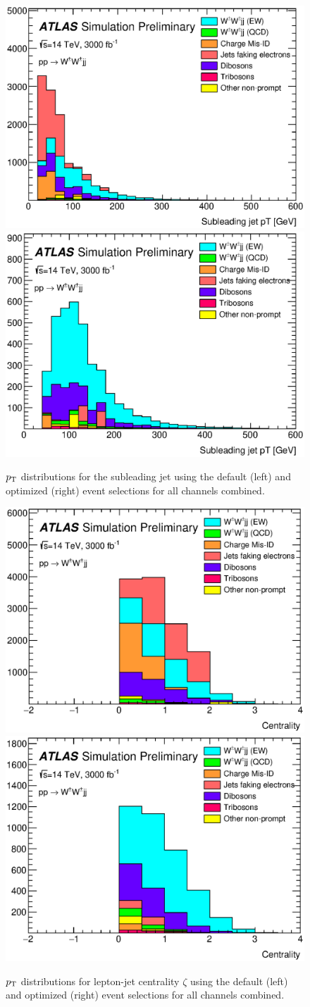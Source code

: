 \begin{figure}[htbp]
  \centering
  \includegraphics[width=.48\textwidth]{figs/ssww_upgrade/distributions/default/all_pass9_jet1_pt}
  \includegraphics[width=.48\textwidth]{figs/ssww_upgrade/distributions/optimized/all_pass9_jet1_pt}
  \caption{$p_{\mathrm{T}}$ distributions for the subleading jet using the default (left) and optimized (right) event selections for all channels combined.}
  \label{fig:sswwupgrade_jet1pt_compare}
\end{figure}

\begin{figure}[htbp]
  \centering
  \includegraphics[width=.48\textwidth]{figs/ssww_upgrade/distributions/default/all_pass9_lepjet_centrality}
  \includegraphics[width=.48\textwidth]{figs/ssww_upgrade/distributions/optimized/all_pass9_lepjet_centrality}
  \caption{$p_{\mathrm{T}}$ distributions for lepton-jet centrality $\zeta$ using the default (left) and optimized (right) event selections for all channels combined.}
  \label{fig:sswwupgrade_centrality_compare}
\end{figure}

